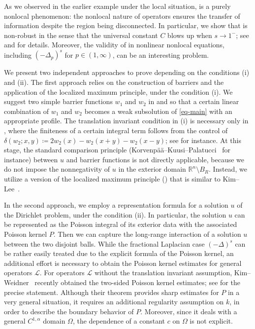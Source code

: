 \documentclass[11pt]{amsart}
\theoremstyle{plain}
\theoremstyle{definition}
\numberwithin{equation}{section}
\begin{document}
As we observed in the earlier example under the local situation,  is a purely nonlocal phenomenon: the nonlocal nature of operators ensures the transfer of information despite the region being disconnected. In particular, we show that  is non-robust in the sense that the universal constant $C$ blows up when $s \to 1^-$; see  and  for details. Moreover, the validity of  in nonlinear nonlocal equations, including $(-\Delta_p)^s$ for $p \in (1, \infty)$, can be an interesting problem.

We present two independent approaches to prove  depending on the conditions (i) and (ii). The first approach relies on the construction of barriers and the application of the localized maximum principle, under the condition (i). We suggest two simple barrier functions $w_1$ and $w_2$ in  and  so that a certain linear combination of $w_1$ and $w_2$ becomes a weak subsolution of \eqref{eq-main} with an appropriate profile. The translation invariant condition in (i) is necessary only in , where the finiteness of a certain integral term follows from the control of $\delta(w_2; x, y) \coloneqq 2w_2(x)-w_2(x+y)-w_2(x-y)$; see \cite{CS09} for instance. At this stage, the standard comparison principle (Korvenp\"a\"a--Kuusi--Palatucci~\cite[Lemma~6]{KKP17} for instance) between $u$ and barrier functions is not directly applicable, because we do not impose the nonnegativity of $u$ in the exterior domain $\mathbb{R}^n \setminus B_R$. Instead, we utilize a version of the localized maximum principle () that is similar to Kim--Lee~\cite[Theorem~1.7]{KL25}.

In the second approach, we employ a representation formula for a solution $u$ of the Dirichlet problem, under the condition (ii). In particular, the solution $u$ can be represented as the Poisson integral of its exterior data with the associated Poisson kernel $P$. Then we can capture the long-range interaction of a solution $u$ between the two disjoint balls. While the fractional Laplacian case $(-\Delta)^s$ can be rather easily treated due to the explicit formula of the Poisson kernel, an additional effort is necessary to obtain the Poisson kernel estimates for general operators $\mathcal{L}$. For operators $\mathcal{L}$ without the translation invariant assumption, Kim--Weidner~\cite{KW24b} recently obtained the two-sided Poisson kernel estimates; see  for the precise statement. Although their theorem provides sharp estimates for $P$ in a very general situation, it requires an additional regularity assumption on $k$, in order to describe the boundary behavior of $P$. Moreover, since it deals with a general $C^{1,\alpha}$ domain $\Omega$, the dependence of a constant $c$ on $\Omega$ is not explicit.
\end{document}
